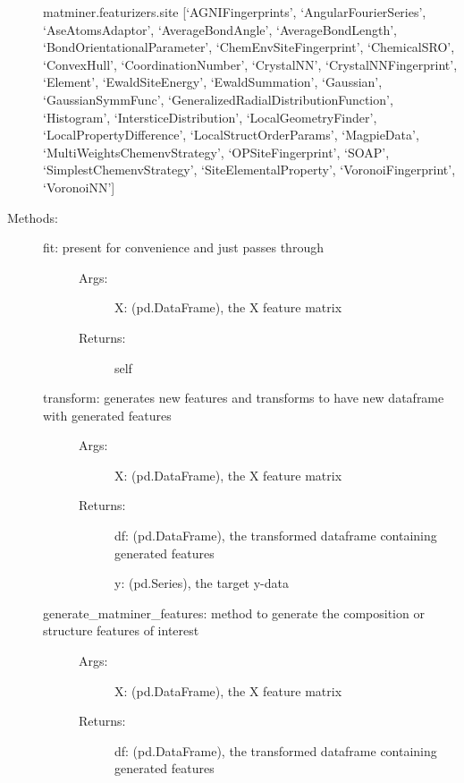\documentclass[letterpaper,10pt,english]{sphinxmanual}
\begin{document}
\begin{fulllineitems}
\begin{description}
matminer.featurizers.site
{[}‘AGNIFingerprints’,
‘AngularFourierSeries’,
‘AseAtomsAdaptor’,
‘AverageBondAngle’,
‘AverageBondLength’,
‘BondOrientationalParameter’,
‘ChemEnvSiteFingerprint’,
‘ChemicalSRO’,
‘ConvexHull’,
‘CoordinationNumber’,
‘CrystalNN’,
‘CrystalNNFingerprint’,
‘Element’,
‘EwaldSiteEnergy’,
‘EwaldSummation’,
‘Gaussian’,
‘GaussianSymmFunc’,
‘GeneralizedRadialDistributionFunction’,
‘Histogram’,
‘IntersticeDistribution’,
‘LocalGeometryFinder’,
‘LocalPropertyDifference’,
‘LocalStructOrderParams’,
‘MagpieData’,
‘MultiWeightsChemenvStrategy’,
‘OPSiteFingerprint’,
‘SOAP’,
‘SimplestChemenvStrategy’,
‘SiteElementalProperty’,
‘VoronoiFingerprint’,
‘VoronoiNN’{]}

\item[{Methods:}] \leavevmode\begin{description}
\item[{fit: present for convenience and just passes through}] \leavevmode\begin{description}
\item[{Args:}] \leavevmode
X: (pd.DataFrame), the X feature matrix

\item[{Returns:}] \leavevmode
self

\end{description}

\item[{transform: generates new features and transforms to have new dataframe with generated features}] \leavevmode\begin{description}
\item[{Args:}] \leavevmode
X: (pd.DataFrame), the X feature matrix

\item[{Returns:}] \leavevmode
df: (pd.DataFrame), the transformed dataframe containing generated features

y: (pd.Series), the target y-data

\end{description}

\item[{generate\_matminer\_features: method to generate the composition or structure features of interest}] \leavevmode\begin{description}
\item[{Args:}] \leavevmode
X: (pd.DataFrame), the X feature matrix

\item[{Returns:}] \leavevmode
df: (pd.DataFrame), the transformed dataframe containing generated features


\end{description}
\end{description}
\end{description}
\end{fulllineitems}
\end{document}
